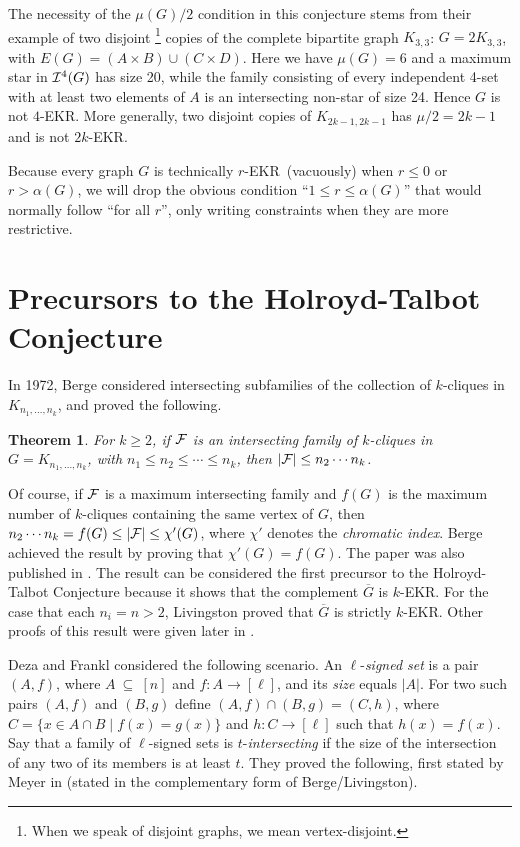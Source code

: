 \documentclass{article}
\newtheorem{thm}{Theorem}%
\def\a{{\alpha}}
\def\m{{\mu}}
\def\x{{\chi}}
\def\cF{{\cal F}}
\def\cI{{\cal I}}
\def\oG{{\overline{G}}}
\def\ekr{{\sf EKR}}
\def\rar{{\rightarrow}}
\def\sse{{\subseteq}}
\begin{document}
The necessity of the $\m(G)/2$ condition in this conjecture stems from their example of two disjoint%
\footnote{When we speak of disjoint graphs, we mean vertex-disjoint.} 
copies of the complete bipartite graph $K_{3,3}$: $G=2K_{3,3}$, with $E(G)=(A\times B)\cup (C\times D)$.
Here we have $\m(G)=6$ and a maximum star in $\cI^4(G)$ has size 20, while the family consisting of every independent 4-set with at least two elements of $A$ is an intersecting non-star of size 24.
Hence $G$ is not $4$-\ekr.
More generally, two disjoint copies of $K_{2k-1,2k-1}$ has $\m/2=2k-1$ and is not $2k$-\ekr.

Because every graph $G$ is technically $r$-\ekr\ (vacuously) when $r\le 0$ or $r>\a(G)$, we will drop the obvious condition ``$1\le r\le \a(G)$'' that would normally follow ``for all $r$'', only writing constraints when they are more restrictive.



\section{Precursors to the Holroyd-Talbot Conjecture}
\label{s:Precursors}

In 1972, Berge \cite{Berge1} considered intersecting subfamilies of the collection of $k$-cliques in $K_{n_1,\ldots,n_k}$, and proved the following.

\begin{thm}
\label{t:Berge}
For $k\ge 2$, if $\cF$ is an intersecting family of $k$-cliques in $G=K_{n_1,\ldots,n_k}$, with $n_1\le n_2\le\cdots\le n_k$, then $|\cF|\le n_2\cdots n_k$.
\end{thm}

Of course, if $\cF$ is a maximum intersecting family and $f(G)$ is the maximum number of $k$-cliques containing the same vertex of $G$, then $n_2\cdots n_k = f(G) \le |\cF| \le \x'(G)$, where $\x'$ denotes the {\it chromatic index}.
Berge achieved the result by proving that $\x'(G)=f(G)$.
The paper was also published in \cite{Berge2}.
The result can be considered the first precursor to the Holroyd-Talbot Conjecture because it shows that the complement $\oG$ is $k$-\ekr.
For the case that each $n_i=n>2$, Livingston \cite{Livingston} proved that $\oG$ is strictly $k$-\ekr.
Other proofs of this result were given later in \cite{Gronau,Moon}.

Deza and Frankl \cite{DezaFran} considered the following scenario.
An $\ell$-{\it signed set} is a pair $(A,f)$, where $A\ \sse\ [n]$ and $f:A\rar [\ell]$, and its {\it size} equals $|A|$.
For two such pairs $(A,f)$ and $(B,g)$ define $(A,f)\cap (B,g) = (C,h)$, where $C=\{x\in A\cap B\mid f(x)=g(x)\}$ and $h:C\rar [\ell]$ such that $h(x)=f(x)$. 
Say that a family of $\ell$-signed sets is $t$-{\it intersecting} if the size of the intersection of any two of its members is at least $t$.
They proved the following, first stated by Meyer in \cite{Meyer} (stated in the complementary form of Berge/Livingston).
\end{document}
